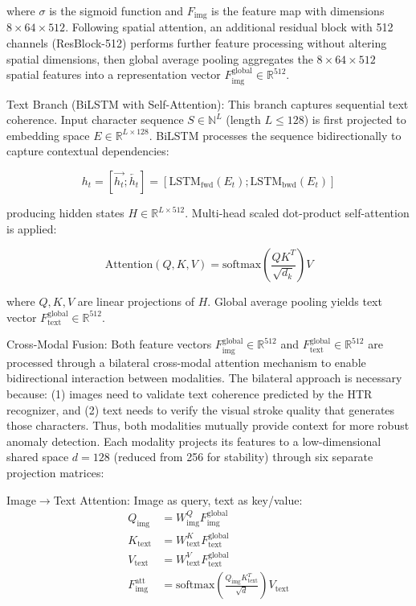 \documentclass[journal]{IEEEtran}
\begin{document}
\noindent where $\sigma$ is the sigmoid function and $F_{\text{img}}$ is the feature map with dimensions $8 \times 64 \times 512$. Following spatial attention, an additional residual block with 512 channels (ResBlock-512) performs further feature processing without altering spatial dimensions, then global average pooling aggregates the $8 \times 64 \times 512$ spatial features into a representation vector $F_{\text{img}}^{\text{global}} \in \mathbb{R}^{512}$.

Text Branch (BiLSTM with Self-Attention): This branch captures sequential text coherence. Input character sequence $S \in \mathbb{N}^{L}$ (length $L \leq 128$) is first projected to embedding space $E \in \mathbb{R}^{L \times 128}$. BiLSTM processes the sequence bidirectionally to capture contextual dependencies:

\begin{equation}
h_t = [\overrightarrow{h_t}; \overleftarrow{h_t}] = [\text{LSTM}_{\text{fwd}}(E_t); \text{LSTM}_{\text{bwd}}(E_t)]
\end{equation}

\noindent producing hidden states $H \in \mathbb{R}^{L \times 512}$. Multi-head scaled dot-product self-attention is applied:

\begin{equation}
\text{Attention}(Q, K, V) = \text{softmax}\left(\frac{QK^T}{\sqrt{d_k}}\right)V
\end{equation}

\noindent where $Q, K, V$ are linear projections of $H$. Global average pooling yields text vector $F_{\text{text}}^{\text{global}} \in \mathbb{R}^{512}$.

Cross-Modal Fusion: Both feature vectors $F_{\text{img}}^{\text{global}} \in \mathbb{R}^{512}$ and $F_{\text{text}}^{\text{global}} \in \mathbb{R}^{512}$ are processed through a bilateral cross-modal attention mechanism to enable bidirectional interaction between modalities. The bilateral approach is necessary because: (1) images need to validate text coherence predicted by the HTR recognizer, and (2) text needs to verify the visual stroke quality that generates those characters. Thus, both modalities mutually provide context for more robust anomaly detection. Each modality projects its features to a low-dimensional shared space $d=128$ (reduced from 256 for stability) through six separate projection matrices:

Image$\rightarrow$Text Attention: Image as query, text as key/value:
\begin{align}
Q_{\text{img}} &= W_{\text{img}}^Q F_{\text{img}}^{\text{global}} \nonumber\\
K_{\text{text}} &= W_{\text{text}}^K F_{\text{text}}^{\text{global}} \nonumber\\
V_{\text{text}} &= W_{\text{text}}^V F_{\text{text}}^{\text{global}} \label{eq:cross_img_proj}\\
F_{\text{img}}^{\text{att}} &= \text{softmax}\left(\frac{Q_{\text{img}} K_{\text{text}}^T}{\sqrt{d}}\right) V_{\text{text}} \label{eq:cross_img_att}
\end{align}
\end{document}
